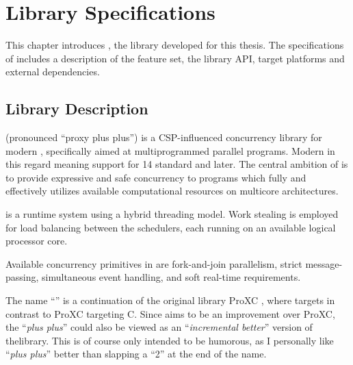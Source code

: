 
\chapter{Library Specifications}
\label{ch:library_specifications}


This chapter introduces \Proxc{}, the library developed for this thesis. The specifications of \Proxc{} includes a description of the feature set, the library API, target platforms and external dependencies. 


\section{Library Description}
\label{sec:library_overview}


\Proxc{} (pronounced ``proxy plus plus'') is a CSP\hyp{}influenced concurrency library for modern \Cpp{}, specifically aimed at multiprogrammed parallel programs. Modern \Cpp{} in this regard meaning support for \Cpp{}14 standard and later. The central ambition of \Proxc{} is to provide expressive and safe concurrency to \Cpp{} programs which fully and effectively utilizes available computational resources on multicore architectures.

\Proxc{} is a runtime system using a hybrid threading model. Work stealing is employed for load balancing between the schedulers, each running on an available logical processor core. 

Available concurrency primitives in \Proxc{} are fork\hyp{}and\hyp{}join parallelism, strict message\hyp{}passing, simultaneous event handling, and soft real\hyp{}time requirements.

The name ``\Proxc{}'' is a continuation of the original library ProXC \citep{pettersen2016proxc}, where \Proxc{} targets \Cpp{} in contrast to ProXC targeting C. Since \Proxc{} aims to be an improvement over ProXC, the ``\textit{plus plus}'' could also be viewed as an ``\textit{incremental better}'' version of thelibrary. This is of course only intended to be humorous, as I personally like ``\textit{plus plus}'' better than slapping a ``2'' at the end of the name.


